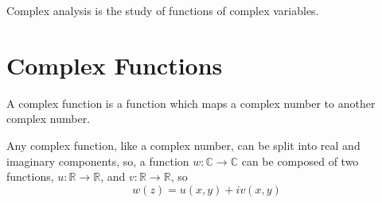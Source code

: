 %

Complex analysis is the study of functions of complex variables.

\section{Complex Functions}
\label{sec:complex-functions}

\begin{definition}
  A complex function is a function which maps a complex number to
  another complex number.
\end{definition}
Any complex function, like a complex number, can be split into real
and imaginary components, so, a function $w: \mathbb{C} \to
\mathbb{C}$ can be composed of two functions, $u: \mathbb{R} \to
\mathbb{R}$, and $v: \mathbb{R} \to \mathbb{R}$, so
\[ w(z) = u(x,y) + i v(x,y) \]

